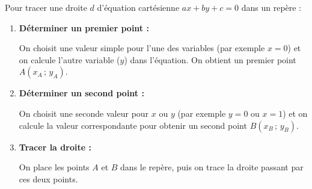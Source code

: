 \begin{methode}
	Pour tracer une droite $d$ d'équation cartésienne $ax + by + c = 0$ dans un repère :

	\begin{enumerate}
		\item \textbf{Déterminer un premier point :}

		      On choisit une valeur simple pour l'une des variables (par exemple $x = 0$) et on calcule l'autre variable ($y$) dans l'équation. On obtient un premier point $A(x_A\,;\,y_A)$.
		\item \textbf{Déterminer un second point :}

		      On choisit une seconde valeur pour $x$ ou $y$ (par exemple $y = 0$ ou $x = 1$) et on calcule la valeur correspondante pour obtenir un second point $B(x_B\,;\,y_B)$.
		\item \textbf{Tracer la droite :}

		      On place les points $A$ et $B$ dans le repère, puis on trace la droite passant par ces deux points.
	\end{enumerate}
\end{methode}

